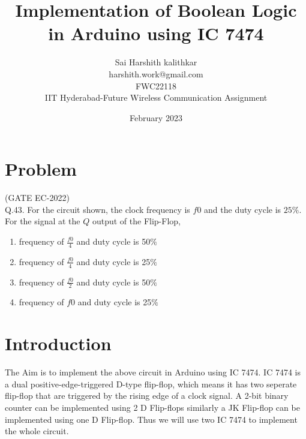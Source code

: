 \documentclass{article}
\title{Implementation of Boolean Logic in Arduino using IC 7474}
\date{February 2023}
\author{Sai Harshith kalithkar\\harshith.work@gmail.com\\FWC22118\\IIT Hyderabad-Future Wireless Communication Assignment}
\begin{document}
\maketitle
	\tableofcontents

\section{Problem}
	(GATE EC-2022)\\
	Q.43. For the circuit shown, the clock frequency is $f0$ and the duty cycle is $25 \%$. For the signal at the $Q$ output of the Flip-Flop,
\\

\begin{enumerate}
	\item frequency of $\frac{f0}{4}$ and duty cycle is 50$\%$
	\item frequency of $\frac{f0}{4}$ and duty cycle is 25$\%$
	\item frequency of $\frac{f0}{2}$ and duty cycle is 50$\%$
	\item frequency of $f0$ and duty cycle is 25$\%$ \\
\end{enumerate}

\section{Introduction}
		The Aim is to implement the above circuit in Arduino using IC 7474. IC 7474 is a dual positive-edge-triggered D-type flip-flop, which means it has two seperate flip-flop that are triggered by the rising edge of a clock signal. A 2-bit binary counter can be implemented using 2 D Flip-flops similarly a JK Flip-flop can be implemented using one D Flip-flop. Thus we will use two IC 7474 to implement the whole circuit.\\
\end{document}
